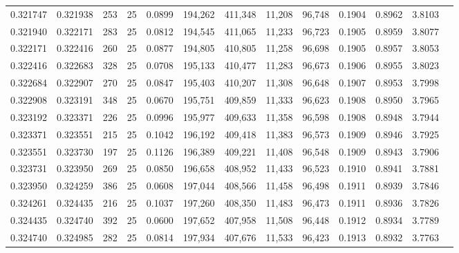 \begin{tabular}{rrrrrrrrrrrrr}
0.321747 & 0.321938 &   253 &  25 &                                     0.0899 & 194,262 & 411,348 &  11,208 &  96,748 & 0.1904 & 0.8962 & 3.8103 \\
0.321940 & 0.322171 &   283 &  25 &                                     0.0812 & 194,545 & 411,065 &  11,233 &  96,723 & 0.1905 & 0.8959 & 3.8077 \\
0.322171 & 0.322416 &   260 &  25 &                                     0.0877 & 194,805 & 410,805 &  11,258 &  96,698 & 0.1905 & 0.8957 & 3.8053 \\
0.322416 & 0.322683 &   328 &  25 &                                     0.0708 & 195,133 & 410,477 &  11,283 &  96,673 & 0.1906 & 0.8955 & 3.8023 \\
0.322684 & 0.322907 &   270 &  25 &                                     0.0847 & 195,403 & 410,207 &  11,308 &  96,648 & 0.1907 & 0.8953 & 3.7998 \\
0.322908 & 0.323191 &   348 &  25 &                                     0.0670 & 195,751 & 409,859 &  11,333 &  96,623 & 0.1908 & 0.8950 & 3.7965 \\
0.323192 & 0.323371 &   226 &  25 &                                     0.0996 & 195,977 & 409,633 &  11,358 &  96,598 & 0.1908 & 0.8948 & 3.7944 \\
0.323371 & 0.323551 &   215 &  25 &                                     0.1042 & 196,192 & 409,418 &  11,383 &  96,573 & 0.1909 & 0.8946 & 3.7925 \\
0.323551 & 0.323730 &   197 &  25 &                                     0.1126 & 196,389 & 409,221 &  11,408 &  96,548 & 0.1909 & 0.8943 & 3.7906 \\
0.323731 & 0.323950 &   269 &  25 &                                     0.0850 & 196,658 & 408,952 &  11,433 &  96,523 & 0.1910 & 0.8941 & 3.7881 \\
0.323950 & 0.324259 &   386 &  25 &                                     0.0608 & 197,044 & 408,566 &  11,458 &  96,498 & 0.1911 & 0.8939 & 3.7846 \\
0.324261 & 0.324435 &   216 &  25 &                                     0.1037 & 197,260 & 408,350 &  11,483 &  96,473 & 0.1911 & 0.8936 & 3.7826 \\
0.324435 & 0.324740 &   392 &  25 &                                     0.0600 & 197,652 & 407,958 &  11,508 &  96,448 & 0.1912 & 0.8934 & 3.7789 \\
0.324740 & 0.324985 &   282 &  25 &                                     0.0814 & 197,934 & 407,676 &  11,533 &  96,423 & 0.1913 & 0.8932 & 3.7763 \\

\end{tabular}
